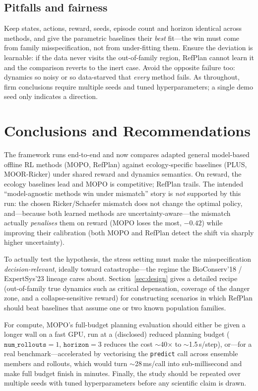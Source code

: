 \documentclass[11pt]{article}
\begin{document}
\subsection{Pitfalls and fairness}
Keep states, actions, reward, seeds, episode count and horizon identical across
methods, and give the parametric baselines their \emph{best} fit---the win must come
from family misspecification, not from under-fitting them. Ensure the deviation is
learnable: if the data never visits the out-of-family region, RefPlan cannot learn
it and the comparison reverts to the inert case. Avoid the opposite failure too:
dynamics so noisy or so data-starved that \emph{every} method fails. As throughout,
firm conclusions require multiple seeds and tuned hyperparameters; a single demo
seed only indicates a direction.

\section{Conclusions and Recommendations}

The framework runs end-to-end and now compares adapted general model-based offline
RL methods (MOPO, RefPlan) against ecology-specific baselines (PLUS, MOOR-Ricker)
under shared reward and dynamics semantics. On reward, the ecology baselines lead
and MOPO is competitive; RefPlan trails. The intended ``model-agnostic methods win
under mismatch'' story is \emph{not} supported by this run: the chosen
Ricker/Schaefer mismatch does not change the optimal policy, and---because both
learned methods are uncertainty-aware---the mismatch actually \emph{penalises} them
on reward (MOPO loses the most, $-0.42$) while improving their calibration (both
MOPO and RefPlan detect the shift via sharply higher uncertainty).

To actually test the hypothesis, the stress setting must make the misspecification
\emph{decision-relevant}, ideally toward catastrophe---the regime the BioConserv'18
/ ExpertSys'23 lineage cares about. Section~\ref{sec:design} gives a detailed recipe
(out-of-family true dynamics such as critical depensation, coverage of the danger
zone, and a collapse-sensitive reward) for constructing scenarios in which RefPlan
should beat baselines that assume one or two known population families.

For compute, MOPO's full-budget planning evaluation should either be given a
longer wall on a fast GPU, run at a (disclosed) reduced planning budget
($\texttt{num\_rollouts}{=}1$, $\texttt{horizon}{=}3$ reduces the cost
$\sim$40$\times$ to $\sim$1.5\,s/step), or---for a real benchmark---accelerated by
vectorising the \texttt{predict} call across ensemble members and rollouts, which
would turn $\sim$28\,ms/call into sub-millisecond and make full budget finish in
minutes. Finally, the study should be repeated over multiple seeds with tuned
hyperparameters before any scientific claim is drawn.
\end{document}
